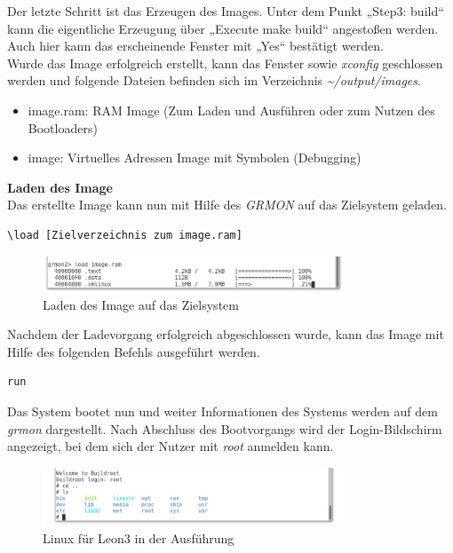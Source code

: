 Der letzte Schritt ist das Erzeugen des Images. Unter dem Punkt „Step3: build“ kann die eigentliche Erzeugung über „Execute make build“ angestoßen werden. Auch hier kann das erscheinende Fenster mit „Yes“ bestätigt werden.\\
Wurde das Image erfolgreich erstellt, kann das Fenster sowie \emph{xconfig} geschlossen werden und folgende Dateien befinden sich im Verzeichnis \emph{\textasciitilde/output/images}.\\
\begin{itemize}
\item image.ram: RAM Image (Zum Laden und Ausführen oder zum Nutzen des Bootloaders)
\item image: Virtuelles Adressen Image mit Symbolen (Debugging)
\end{itemize}

\newpage
\textbf{Laden des Image}\\

Das erstellte Image kann nun mit Hilfe des \emph{GRMON} auf das Zielsystem geladen.\\

\begin{lstlisting}[caption={Laden des Image},label={code:linuximage}]
\load [Zielverzeichnis zum image.ram]
\end{lstlisting}

\begin{figure}[H]
\centering
\includegraphics[width=0.8\textwidth]{Hauptteil/loadimage.png}
\caption{Laden des Image auf das Zielsystem}
\label{fig:toolchainconf}
\end{figure}

Nachdem der Ladevorgang erfolgreich abgeschlossen wurde, kann das Image mit Hilfe des folgenden Befehls ausgeführt werden.\\

\begin{lstlisting}[caption={Ausführen des Image},label={code:linuxrun}]
run
\end{lstlisting}


Das System bootet nun und weiter Informationen des Systems werden auf dem \emph{grmon} dargestellt. Nach Abschluss des Bootvorgangs wird der Login-Bildschirm angezeigt, bei
dem sich der Nutzer mit \emph{root} anmelden kann.\\

\begin{figure}[H]
\centering
\includegraphics[width=0.8\textwidth]{Hauptteil/leon3linux.png}
\caption{Linux für Leon3 in der Ausführung}
\label{fig:leon3linux}
\end{figure}
